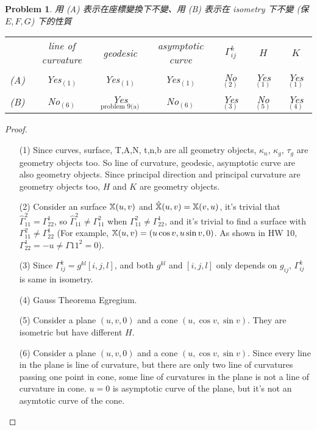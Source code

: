 \documentclass[10pt,a4paper]{article}
\newcounter{theProblemCounter}
\newtheorem{problem}[theProblemCounter]{Problem}
\begin{document}
\setcounter{theProblemCounter}{7}
\begin{problem}
用 (A) 表示在座標變換下不變、用 (B) 表示在 isometry 下不變 (保 $E, F, G$) 下的性質

\begin{tabular}{c|c|c|c|c|c|c|}
\cline{2-7}
 & line of curvature & geodesic & asymptotic curve & $\Gamma^{k}_{ij}$ & $H$ & $K$ \\
\cline{2-7}
(A) & Yes$_{(1)}$ & Yes$_{(1)}$ & Yes$_{(1)}$ & No$_{(2)}$ & Yes$_{(1)}$ & Yes$_{(1)}$\\
\cline{2-7}
(B) & No$_{(6)}$ & Yes$_{\textrm{problem 9(a)}}$ & No$_{(6)}$ & Yes$_{(3)}$ & No$_{(5)}$ & Yes$_{(4)}$\\
\cline{2-7}
\end{tabular}
\end{problem}
\begin{proof}
\begin{enumerate}
\item[(1)]
Since curves, surface, T,A,N, t,n,b are all geometry objects, $\kappa_n$, $\kappa_g$, $\tau_g$ are geometry objects too. So line of curvature, geodesic, asymptotic curve are also geometry objects. Since principal direction and principal curvature are geometry objects too, $H$ and $K$ are geometry objects.
\item[(2)]
Consider an surface $\mathbb{X}(u,v)$ and $\hat{\mathbb{X}}(u,v)=\mathbb{X}(v,u)$, it's trivial that $\hat{\Gamma}^2_{11}=\Gamma^1_{22}$, so $\hat{\Gamma}^2_{11}\neq\Gamma^2_{11}$ when $\Gamma^2_{11}\neq \Gamma^1_{22}$, and it's trivial to find a surface with $\Gamma^2_{11}\neq \Gamma^1_{22}$ (For example, $\mathbb{X}(u,v)=(u\cos{v},u\sin{v},0)$. As shown in HW 10, $\Gamma_{22}^1=-u\neq \Gamma{11}^2=0$).
\item[(3)]
Since $\Gamma_{ij}^k=g^{kl}[i,j,l]$, and both $g^{kl}$ and $[i,j,l]$ only depends on $g_{ij}$, $\Gamma_{ij}^k$ is same in isometry.
\item[(4)]
Gauss Theorema Egregium.
\item[(5)]
Consider a plane $(u,v,0)$ and a cone $(u,\cos{v},\sin{v})$. They are isometric but have different $H$.
\item[(6)]
Consider a plane $(u,v,0)$ and a cone $(u,\cos{v},\sin{v})$. Since every line in the plane is line of curvature, but there are only two line of curvatures passing one point in cone, some line of curvatures in the plane is not a line of curvature in cone. $u=0$ is asymptotic curve of the plane, but it's not an asymtotic curve of the cone.
\end{enumerate}
\end{proof}
\end{document}
